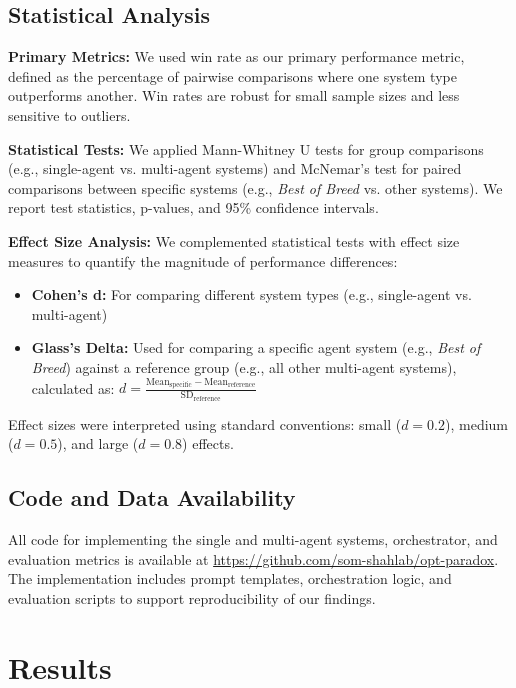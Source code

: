 \documentclass[manuscript, nonacm]{acmart}
\begin{document}
\subsection{Statistical Analysis}

\textbf{Primary Metrics:} We used win rate as our primary performance metric, defined as the percentage of pairwise comparisons where one system type outperforms another. Win rates are robust for small sample sizes and less sensitive to outliers.

\textbf{Statistical Tests:} We applied Mann-Whitney U tests for group comparisons (e.g., single-agent vs. multi-agent systems) and McNemar's test for paired comparisons between specific systems (e.g., \textit{Best of Breed} vs. other systems). We report test statistics, p-values, and 95\% confidence intervals.

\textbf{Effect Size Analysis:} We complemented statistical tests with effect size measures to quantify the magnitude of performance differences:
\begin{itemize}
    \item \textbf{Cohen's d:} For comparing different system types (e.g., single-agent vs. multi-agent)
    
    \item \textbf{Glass's Delta:} Used for comparing a specific agent system (e.g., \textit{Best of Breed}) against a reference group (e.g., all other multi-agent systems), calculated as: 
    $d = \frac{\text{Mean}_{\text{specific}} - \text{Mean}_{\text{reference}}}{\text{SD}_{\text{reference}}}$
\end{itemize}

Effect sizes were interpreted using standard conventions: small ($d = 0.2$), medium ($d = 0.5$), and large ($d = 0.8$) effects. 

\subsection{Code and Data Availability}
All code for implementing the single and multi-agent systems, orchestrator, and evaluation metrics is available at \textcolor{blue}{\url{https://github.com/som-shahlab/opt-paradox}}. The implementation includes prompt templates, orchestration logic, and evaluation scripts to support reproducibility of our findings.

\section{Results}
\end{document}
